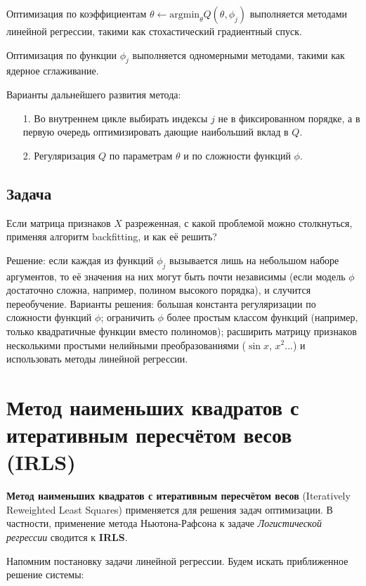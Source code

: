 {Оптимизация по коэффициентам $\theta \gets \text{argmin}_{\theta}Q(\theta, \phi_j)$ выполняется методами линейной регрессии, такими как стохастический градиентный спуск.

Оптимизация по функции $\phi_j$ выполняется одномерными методами, такими как ядерное сглаживание.

Варианты дальнейшего развития метода:
\begin{itemize}
    \item [1.] Во внутреннем цикле выбирать индексы $j$ не в фиксированном порядке, а в первую очередь оптимизировать дающие наибольший вклад в $Q$.
    \item [2.] Регуляризация $Q$ по параметрам $\theta$ и по сложности функций $\phi$.
\end{itemize}

\subsection{Задача}

Если матрица признаков $X$ разреженная, с какой проблемой можно столкнуться, применяя алгоритм backfitting, и как её решить?

Решение: если каждая из функций $\phi_j$ вызывается лишь на небольшом наборе аргументов, то её значения на них могут быть почти независимы (если модель $\phi$ достаточно сложна, например, полином высокого порядка), и случится переобучение. Варианты решения: большая константа регуляризации по сложности функций $\phi$; ограничить $\phi$ более простым классом функций (например, только квадратичные функции вместо полиномов); расширить матрицу признаков несколькими простыми нелийными преобразованиями ($\sin x$, $x^2$...) и использовать методы линейной регрессии.

\section{Метод наименьших квадратов с итеративным пересчётом весов (IRLS)}

\textbf{Метод наименьших квадратов с итеративным пересчётом весов} (Iteratively Reweighted Least Squares) применяется для решения задач оптимизации. В частности, применение метода Ньютона-Рафсона к задаче \textit{Логистической регрессии} сводится к \textbf{IRLS}.

Напомним постановку задачи линейной регрессии. Будем искать приближенное решение системы:

}

